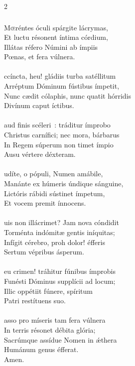 \documentclass[9pt,twoside]{extarticle}
\begin{document}
\begin{multicols}{2}
{\subsubsection*{\center {}}
\lettrine{M}œréntes óculi spárgite lácrymas,\\
Et luctu résonent íntima córdium,\\
Illátas réfero Númini ab ímpiis\\
Pœnas, et fera vúlnera.\\
\\
ccíncta, heu! gládiis turba satéllitum\\
Arréptum Dóminum fústibus ímpetit,\\
Nunc cædit cólaphis, nunc quatit hórridis\\
Divínum caput íctibus.\\
\\
aud finis scéleri~: tráditur ímprobo\\
Christus carnífici; nec mora, bárbarus\\
In Regem súperum non timet ímpio\\
Ausu vértere déxteram.\\
\\
udíte, o pópuli, Numen amábile,\\
Manánte ex húmeris úndique sánguine,\\
Lictóris rábidi sústinet ímpetum,\\
Et vocem premit ínnocens.\\
\\
uis non illácrimet? Jam nova cóndidit\\
Torménta indómitæ gentis iníquitas;\\
Infígit cérebro, proh dolor! éfferis\\
Sertum vépribus ásperum.\\
\\
eu crimen! tráhitur fúnibus ímprobis\\
Funésti Dóminus supplícii ad locum;\\
Illic oppétiit fúnere, spíritum\\
Patri restítuens suo.\\
\\
asso pro míseris tam fera vúlnera\\
In terris résonet débita glória;\\
Sacrúmque assídue Nomen in ǽthera\\
Humánum genus éfferat.\\
Amen.

}
\end{multicols}
\end{document}
